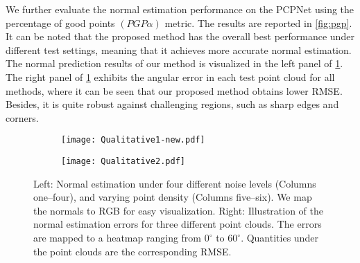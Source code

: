 \documentclass[runningheads]{llncs}
\begin{document}
We further evaluate the normal estimation performance on the PCPNet using the percentage of good points $\left(PGP \alpha \right)$ metric. The results are reported in \cref{fig:pgp}. It can be noted that the proposed
method has the overall best performance under different test settings, meaning that it achieves more accurate normal estimation. The normal prediction results of our method is visualized in the left panel of \cref{fig:quali1}. The right panel of \cref{fig:quali1} exhibits the angular error in each test point cloud for all methods, where it can be seen that our proposed method obtains lower RMSE. Besides, it is quite robust against challenging regions, such as sharp edges and corners.

\begin{figure}[t]
  \centering
  \begin{subfigure}{0.485\linewidth}
    \texttt{[image: Qualitative1-new.pdf]}
\end{subfigure}
  \begin{subfigure}{0.493\linewidth}
    \texttt{[image: Qualitative2.pdf]}
\end{subfigure}
    \caption{Left: Normal estimation under four different
noise levels (Columns one--four), and varying point density (Columns
five--six). We map the normals to RGB for easy visualization. Right: Illustration of the normal estimation errors for three different point clouds. The errors are mapped to a heatmap ranging from $0^\circ$ to $60^\circ$. Quantities under the point clouds are the corresponding RMSE.}
    \label{fig:quali1}
\end{figure}
\begin{table}[t]
\centering
\caption{Statistics of the angle RMSE on the real-world SceneNN dataset~\cite{hua-pointwise-cvpr18}.}
\label{tab:scenenn}
\end{table}
\end{document}
